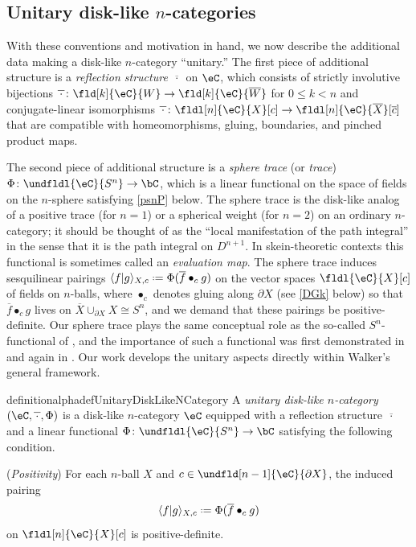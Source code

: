\documentclass[12pt,reqno]{amsart}
\newcounter{alpha}\renewcommand\thealpha{\upshape\Alph{alpha}}
\newcommand{\psn}{\Phi}
\newcommand{\C}{\eC}
\newcommand{\blt}{\bullet}
\newcommand{\fcj}[1]{\overline{#1}}
\newcommand{\orev}{\overline}
\newcommand{\bkt}[2]{\langle #1|#2 \rangle}
\newcommand{\defn}[1]{\emph{#1}}
\DeclareRobustCommand{\coloneq}{\mathrel{\vcenter{\baselineskip0.5ex\lineskiplimit0pt\hbox{\scriptsize{\upshape.}}\hbox{\scriptsize{\upshape.}}}}=}
\begin{document}
\subsection{Unitary disk-like \texorpdfstring{$n$}{n}-categories}
With these conventions and motivation in hand, we now describe the additional data making a disk-like $n$-category ``unitary.'' The first piece of additional structure is a \defn{reflection structure} $\fcj{\,\cdot\,}$ on $\C$, which consists of strictly involutive bijections $\fcj{\,\cdot\,}\colon\fld[k]{\C}{W}\to\fld[k]{\C}{\orev{W}}$ for $0\leq k<n$ and conjugate-linear isomorphisms $\fcj{\,\cdot\,}\colon\fldl[n]{\C}{X}[c]\to\fldl[n]{\C}{\orev{X}}[\fcj{c}]$ that are compatible with homeomorphisms, gluing, boundaries, and pinched product maps.

The second piece of additional structure is a \defn{sphere trace} (or \defn{trace}) $\psn\colon\undfldl{\C}{S^n}\to\bC$, which is a linear functional on the space of fields on the $n$-sphere satisfying \ref{psnP} below. The sphere trace is the disk-like analog of a positive trace (for $n=1$) or a spherical weight (for $n=2$) on an ordinary $n$-category; it should be thought of as the ``local manifestation of the path integral'' in the sense that it is the path integral on $D^{n+1}$. In skein-theoretic contexts this functional is sometimes called an \defn{evaluation map}. The sphere trace induces sesquilinear pairings $\bkt{f}{g}_{X,c}\coloneq\psn(\fcj{f}\blt_c g)$ on the vector spaces $\fldl{\C}{X}[c]$ of fields on $n$-balls, where $\blt_c$ denotes gluing along $\partial X$ (see \ref{DGk} below) so that $\fcj f\blt_c g$ lives on $\orev X\cup_{\partial X}X\cong S^n$, and we demand that these pairings be positive-definite.
Our sphere trace plays the same conceptual role as the so-called $S^n$-functional of \cite{Z24,LZ26}, and the importance of such a functional was first demonstrated in \cite{W06} and again in \cite{W21}. Our work develops the unitary aspects directly within Walker's general framework.

\begin{restatable}{definitionalpha}{defUnitaryDiskLikeNCategory}
    \label{def:intro-UDL}
    A \defn{unitary disk-like $n$-category} $(\C,\fcj{\,\cdot\,},\psn)$ is a disk-like $n$-category $\C$ equipped with a reflection structure $\fcj{\,\cdot\,}$ and a linear functional $\psn\colon\undfldl{\C}{S^n}\to\bC$ satisfying the following condition.
    \begin{lst}[font=\upshape,leftmargin=0.425in]
        \item[($\psn$P)]
        (\emph{Positivity})
        For each $n$-ball $X$ and $c\in\undfld[n-1]{\C}{\partial X}$, the induced pairing
        \begin{equation}\label{intro-disk-pairings}
            \bkt{f}{g}_{X,c}\coloneq\psn(\fcj f\blt_c g)
        \end{equation}
        on $\fldl[n]{\C}{X}[c]$ is positive-definite.
    \end{lst}
\end{restatable}
\end{document}
